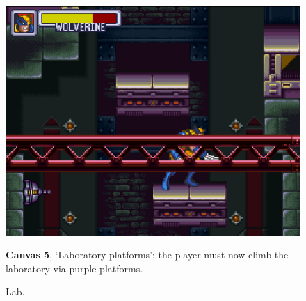 \documentclass[english]{textolivre}
\begin{document}
\begin{figure}[htbp]
\begin{minipage}[t]{.47\textwidth}
\vspace{0pt}
\includegraphics[width=\textwidth]{fig-8.png}
\caption{Lab.}
\label{fig-8}
\end{minipage}
\hfill
\begin{minipage}[t]{.47\textwidth}
\vspace{2pt}
\textbf{Canvas 5}, ‘Laboratory platforms’: the player must now climb the laboratory via purple platforms.
\end{minipage}
\end{figure}
\end{document}
